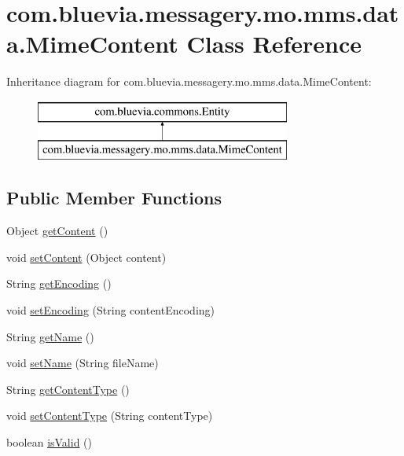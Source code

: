 \hypertarget{classcom_1_1bluevia_1_1messagery_1_1mo_1_1mms_1_1data_1_1MimeContent}{
\section{com.bluevia.messagery.mo.mms.data.MimeContent Class Reference}
\label{classcom_1_1bluevia_1_1messagery_1_1mo_1_1mms_1_1data_1_1MimeContent}
}
Inheritance diagram for com.bluevia.messagery.mo.mms.data.MimeContent:\begin{figure}[H]
\begin{center}
\leavevmode
\includegraphics[height=2.000000cm]{classcom_1_1bluevia_1_1messagery_1_1mo_1_1mms_1_1data_1_1MimeContent}
\end{center}
\end{figure}
\subsection*{Public Member Functions}
\begin{DoxyCompactItemize}
\item 
Object \hyperlink{classcom_1_1bluevia_1_1messagery_1_1mo_1_1mms_1_1data_1_1MimeContent_aa364ab05c0f99ebfc97bfc41f7a8ce52}{getContent} ()
\item 
void \hyperlink{classcom_1_1bluevia_1_1messagery_1_1mo_1_1mms_1_1data_1_1MimeContent_a813f594551676b9ab00bf6f4be298100}{setContent} (Object content)
\item 
String \hyperlink{classcom_1_1bluevia_1_1messagery_1_1mo_1_1mms_1_1data_1_1MimeContent_a065f3c645107ea4bef6a3c7392ec3d2d}{getEncoding} ()
\item 
void \hyperlink{classcom_1_1bluevia_1_1messagery_1_1mo_1_1mms_1_1data_1_1MimeContent_aa23a1887786a8e9bc9376f0005a2e6a9}{setEncoding} (String contentEncoding)
\item 
String \hyperlink{classcom_1_1bluevia_1_1messagery_1_1mo_1_1mms_1_1data_1_1MimeContent_ab12c5f9cb4bfb798efcccb302bb15a3c}{getName} ()
\item 
void \hyperlink{classcom_1_1bluevia_1_1messagery_1_1mo_1_1mms_1_1data_1_1MimeContent_ab68336eda2233af9161ba178a0b0aea1}{setName} (String fileName)
\item 
String \hyperlink{classcom_1_1bluevia_1_1messagery_1_1mo_1_1mms_1_1data_1_1MimeContent_ad26c35360f2ee1c9474239caf13f7e37}{getContentType} ()
\item 
void \hyperlink{classcom_1_1bluevia_1_1messagery_1_1mo_1_1mms_1_1data_1_1MimeContent_a513891948942abd2b0a7e06aeea786d5}{setContentType} (String contentType)
\item 
boolean \hyperlink{classcom_1_1bluevia_1_1messagery_1_1mo_1_1mms_1_1data_1_1MimeContent_a2c7fad2a604439c69c2df90086b19103}{isValid} ()
\end{DoxyCompactItemize}


